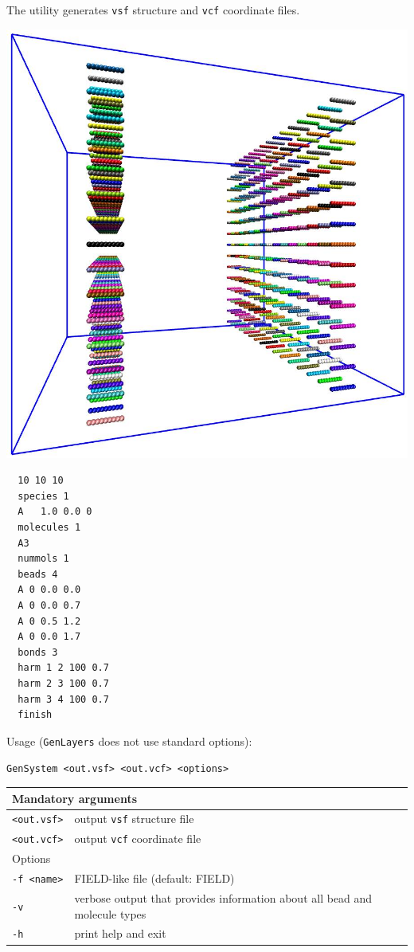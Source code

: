 The utility generates \texttt{vsf} structure and \texttt{vcf} coordinate
files.

\begin{minipage}{0.5\textwidth}
  \includegraphics[angle=180,width=\textwidth]{GenLayers-478ctac.jpg}
\end{minipage}
\begin{minipage}{0.5\textwidth}
\begin{verbatim}
  10 10 10
  species 1
  A   1.0 0.0 0
  molecules 1
  A3
  nummols 1
  beads 4
  A 0 0.0 0.0
  A 0 0.0 0.7
  A 0 0.5 1.2
  A 0 0.0 1.7
  bonds 3
  harm 1 2 100 0.7
  harm 2 3 100 0.7
  harm 3 4 100 0.7
  finish
\end{verbatim}
\end{minipage}

Usage (\texttt{GenLayers} does not use standard options):

\vspace{1em}
\noindent
\texttt{GenSystem <out.vsf> <out.vcf> <options>}

\noindent
\begin{longtable}{p{}p{}}
  \toprule
  \multicolumn{2}{l}{Mandatory arguments} \\
  \midrule
  \texttt{<out.vsf>} & output \texttt{vsf} structure file \\
  \texttt{<out.vcf>} & output \texttt{vcf} coordinate file \\
  \toprule
  \multicolumn{2}{l}{Options} \\
  \midrule
  \texttt{-f <name>} & FIELD-like file (default: FIELD)\\
  \texttt{-v}        & verbose output that provides information about all
    bead and molecule types \\
  \texttt{-h}        & print help and exit \\
  \bottomrule
\end{longtable}
